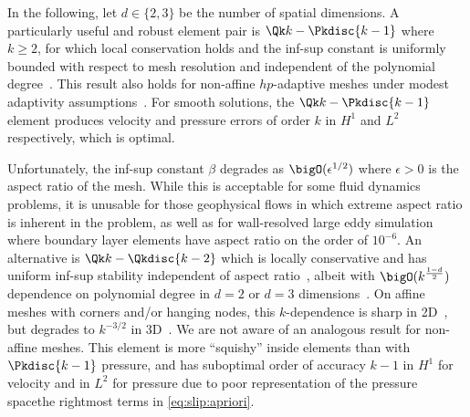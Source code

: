 In the following, let $d\in \{2,3\}$ be the number of spatial dimensions.
A particularly useful and robust element pair is $\Qk k-\Pkdisc{k-1}$ where $k \ge 2$, for which local conservation holds and the inf-sup constant is uniformly bounded with respect to mesh resolution and independent of the polynomial degree~\cite{bernardi1999uniform}.
This result also holds for non-affine $hp$-adaptive meshes under modest adaptivity assumptions~\cite{schieweck2008uniformly}.
For smooth solutions, the $\Qk k-\Pkdisc{k-1}$ element produces velocity and pressure errors of order $k$ in $H^1$ and $L^2$ respectively, which is optimal.

Unfortunately, the inf-sup constant $\beta$ degrades as $\bigO(\epsilon^{1/2})$ where $\epsilon > 0$ is the aspect ratio of the mesh.
While this is acceptable for some fluid dynamics problems, it is unusable for those geophysical flows in which extreme aspect ratio is inherent in the problem, as well as for wall-resolved large eddy simulation where boundary layer elements have aspect ratio on the order of $10^{-6}$.
An alternative is $\Qk k - \Qkdisc{k-2}$ which is locally conservative and has uniform inf-sup stability independent of aspect ratio~\cite{stenberg1996mixed,schotzau1998mhf}, albeit with $\bigO(k^\frac{1-d}{2})$ dependence on polynomial degree in $d=2$ or $d=3$ dimensions~\cite{maday1992pn}.
On affine meshes with corners and/or hanging nodes, this $k$-dependence is sharp in 2D~\cite{schotzau1999mhf}, but degrades to $k^{-3/2}$ in 3D~\cite{toselli2003mhf}.
We are not aware of an analogous result for non-affine meshes.
This element is more ``squishy'' inside elements than with $\Pkdisc{k-1}$ pressure, and has suboptimal order of accuracy $k-1$ in $H^1$ for velocity and in $L^2$ for pressure due to poor representation of the pressure spacethe rightmost terms in \eqref{eq:slip:apriori}.

